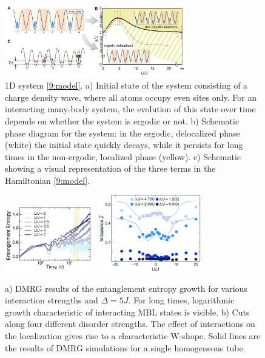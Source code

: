 








\begin{figure}[h]
    \centering
    \includegraphics[width=0.7\textwidth]{imgs/1d_phases.png}
    \caption{\cite{schreiber_observation_2015} 1D system \eqref{9:model}. a) Initial state of the system consisting of a charge density wave, where all atoms occupy even sites only. For an interacting many-body system, the evolution of this state over time depends on whether the system is ergodic or not. b) Schematic phase diagram for the system: in the ergodic, delocalized phase (white) the initial state quickly decays, while it persists for long times in the non-ergodic, localized phase (yellow). c) Schematic showing a visual representation of the three terms in the Hamiltonian \eqref{9:model}. }
    \label{fig:1Dmain}
\end{figure}






\begin{figure}[h]
    \centering
    \includegraphics[align=c, width=0.35\textwidth]{imgs/1d_add1.png}
    \hspace{10 mm} 
    \includegraphics[align=c, width=0.4\textwidth]{imgs/1d_add2.png}
    \caption{
    \cite{schreiber_observation_2015}
        a) DMRG results of the entanglement entropy growth for various interaction strengths and $\Delta = 5 J$. For long times, logarithmic growth characteristic of interacting MBL states is visible.
        b) Cuts along four different disorder strengths. The effect of interactions on the localization gives rise to a characteristic W-shape. Solid lines are the results of DMRG simulations for a single homogeneous tube. 
    }
    \label{fig:1daddb}
\end{figure}


